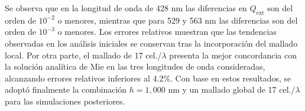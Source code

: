 Se observa que en la longitud de onda de 428 nm las diferencias en $Q_{\text{ext}}$ son del orden de $10^{-2}$ o menores, mientras que para 529 y 563 nm las diferencias son del orden de $10^{-3}$ o menores. Los errores relativos muestran que las tendencias observadas en los análisis iniciales se conservan tras la incorporación del mallado local. Por otra parte, el mallado de 17 cel./$\lambda$ presenta la mejor concordancia con la solución analítica de Mie en las tres longitudes de onda consideradas, alcanzando errores relativos inferiores al 4.2\%. Con base en estos resultados, se adoptó finalmente la combinación $h=1,000$ nm y un mallado global de 17 cel./$\lambda$ para las simulaciones posteriores.



